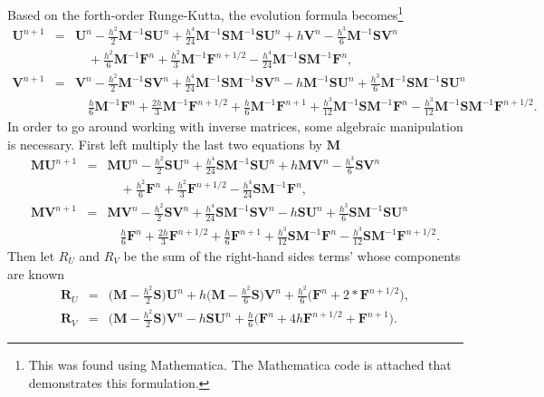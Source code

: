 Based on the forth-order Runge-Kutta, the evolution formula becomes\footnote{This was found using Mathematica. The Mathematica code is attached that demonstrates this formulation.}
\begin{eqnarray*}
  \bm{U}^{n+1} & = & \bm{U}^n - \frac{h^2}{2}\bm{M}^{-1}\bm{SU}^n + \frac{h^4}{24}\bm{M}^{-1}\bm{S}\bm{M}^{-1}\bm{SU}^n + h\bm{V}^n - \frac{h^3}{6}\bm{M}^{-1}\bm{SV}^n \\
  & & \quad + \frac{h^2}{6}\bm{M}^{-1}\bm{F}^n + \frac{h^2}{3}\bm{M}^{-1}\bm{F}^{n+1/2} - \frac{h^4}{24}\bm{M}^{-1}\bm{S}\bm{M}^{-1}\bm{F}^n, \\
  \bm{V}^{n+1} & = & \bm{V}^n - \frac{h^2}{2}\bm{M}^{-1}\bm{SV}^n + \frac{h^4}{24}\bm{M}^{-1}\bm{S}\bm{M}^{-1}\bm{SV}^n - h\bm{M}^{-1}\bm{SU}^n + \frac{h^3}{6}\bm{M}^{-1}\bm{S}\bm{M}^{-1}\bm{SU}^n \\
  & & \quad \frac{h}{6}\bm{M}^{-1}\bm{F}^n + \frac{2h}{3}\bm{M}^{-1}\bm{F}^{n+1/2} + \frac{h}{6}\bm{M}^{-1}\bm{F}^{n+1} + \frac{h^3}{12}\bm{M}^{-1}\bm{S}\bm{M}^{-1}\bm{F}^n - \frac{h^3}{12}\bm{M}^{-1}\bm{S}\bm{M}^{-1}\bm{F}^{n+1/2}.
\end{eqnarray*}
In order to go around working with inverse matrices, some algebraic manipulation is necessary. First left multiply the last two equations by $\bm{M}$
\begin{eqnarray*}
  \bm{MU}^{n+1} & = & \bm{MU}^n - \frac{h^2}{2}\bm{SU}^n + \frac{h^4}{24}\bm{S}\bm{M}^{-1}\bm{SU}^n + h\bm{MV}^n - \frac{h^3}{6}\bm{SV}^n \\
  & & \quad + \frac{h^2}{6}\bm{F}^n + \frac{h^2}{3}\bm{F}^{n+1/2} - \frac{h^4}{24}\bm{S}\bm{M}^{-1}\bm{F}^n, \\
  \bm{MV}^{n+1} & = & \bm{MV}^n - \frac{h^2}{2}\bm{SV}^n + \frac{h^4}{24}\bm{S}\bm{M}^{-1}\bm{SV}^n - h\bm{SU}^n + \frac{h^3}{6}\bm{S}\bm{M}^{-1}\bm{SU}^n \\
  & & \quad \frac{h}{6}\bm{F}^n + \frac{2h}{3}\bm{F}^{n+1/2} + \frac{h}{6}\bm{F}^{n+1} + \frac{h^3}{12}\bm{S}\bm{M}^{-1}\bm{F}^n - \frac{h^3}{12}\bm{S}\bm{M}^{-1}\bm{F}^{n+1/2}.
\end{eqnarray*}
Then let $R_U$ and $R_V$ be the sum of the right-hand sides terms' whose components are known
\begin{eqnarray*}
  \bm{R}_U & = & \bigg(\bm{M}-\frac{h^2}{2}\bm{S}\bigg)\bm{U}^n + h\bigg(\bm{M}-\frac{h^2}{6}\bm{S}\bigg)\bm{V}^n + \frac{h^2}{6}\bigg(\bm{F}^n+2*\bm{F}^{n+1/2}\bigg), \\
  \bm{R}_V  & = & \bigg(\bm{M}-\frac{h^2}{2}\bm{S}\bigg)\bm{V}^n - h\bm{SU}^n + \frac{h}{6}\bigg(\bm{F}^n+4h\bm{F}^{n+1/2}+\bm{F}^{n+1}\bigg).
\end{eqnarray*}
